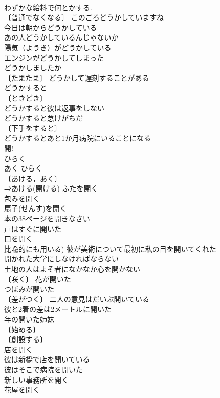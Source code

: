 \documentclass[8pt]{extreport}
\begin{document}
\begin{CJK}{UTF8}{min}
\\	わずかな給料で何とかする. 
\\	〔普通でなくなる〕 このごろどうかしていますね 
\\	今日は朝からどうかしている 
\\	あの人どうかしているんじゃないか 
\\	陽気（ようき）がどうかしている 
\\	エンジンがどうかしてしまった 
\\	どうかしましたか 
\\	〔たまたま〕 どうかして遅刻することがある 
\\	どうかすると 
\\	〔ときどき〕
\\	どうかすると彼は返事をしない 
\\	どうかすると怠けがちだ 
\\	〔下手をすると〕 
\\	どうかするとあと1か月病院にいることになる 
\\	開! 
\\	ひらく 
\\	あく ひらく 
\\	〔あける，あく〕
\\	⇒あける(開ける) ふたを開く 
\\	包みを開く 
\\	扇子(せんす)を開く 
\\	本の38ページを開きなさい 
\\	戸はすぐに開いた 
\\	口を開く 
\\	比喩的にも用いる) 彼が美術について最初に私の目を開いてくれた 
\\	開かれた大学にしなければならない 
\\	土地の人はよそ者になかなか心を開かない 
\\	〔咲く〕 花が開いた 
\\	つぼみが開いた 
\\	〔差がつく〕 二人の意見はだいぶ開いている 
\\	彼と2着の差は2メートルに開いた 
\\	年の開いた姉妹 
\\	〔始める〕
\\	〔創設する〕
\\	店を開く 
\\	彼は新橋で店を開いている 
\\	彼はそこで病院を開いた 
\\	新しい事務所を開く 
\\	花屋を開く 

\end{CJK}
\end{document}
